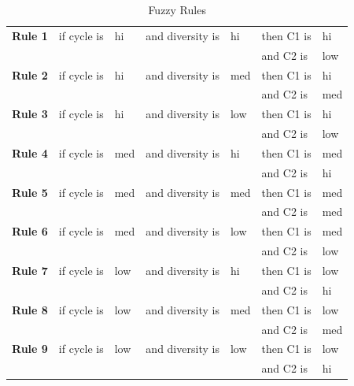 \documentclass[graybox]{svmult}
\begin{document}
\begin{table}[htbp] 
\caption{Fuzzy Rules}\label{tab:fuzzy_rules}
\setlength{\tabcolsep}{8pt}
\begin{tabular}{l l l l l l l}
\hline
\textbf{Rule 1}  & if cycle is & hi & and diversity is & hi & then C1 is & hi  \\
                 &             &    &                  &    & and C2 is  & low \\ \hline
\textbf{Rule 2}  & if cycle is & hi & and diversity is & med & then C1 is & hi  \\
                 &             &    &                  &    & and C2 is  & med \\ \hline
\textbf{Rule 3}  & if cycle is & hi & and diversity is & low & then C1 is & hi  \\
                 &             &    &                  &    & and C2 is  & low \\ \hline
\textbf{Rule 4}  & if cycle is & med & and diversity is & hi & then C1 is & med  \\
                 &             &    &                  &    & and C2 is  & hi \\ \hline
\textbf{Rule 5}  & if cycle is & med & and diversity is & med & then C1 is & med  \\
                 &             &    &                  &    & and C2 is  & med \\ \hline
\textbf{Rule 6}  & if cycle is & med & and diversity is & low & then C1 is & med  \\
                 &             &    &                  &    & and C2 is  & low \\ \hline
\textbf{Rule 7}  & if cycle is & low & and diversity is & hi & then C1 is & low  \\
                 &             &    &                  &    & and C2 is  & hi \\ \hline
\textbf{Rule 8}  & if cycle is & low & and diversity is & med & then C1 is & low  \\
                 &             &    &                  &    & and C2 is  & med \\ \hline
\textbf{Rule 9}  & if cycle is & low & and diversity is & low & then C1 is & low  \\
                 &             &    &                  &    & and C2 is  & hi \\ \hline

\end{tabular}
\end{table}
\end{document}
